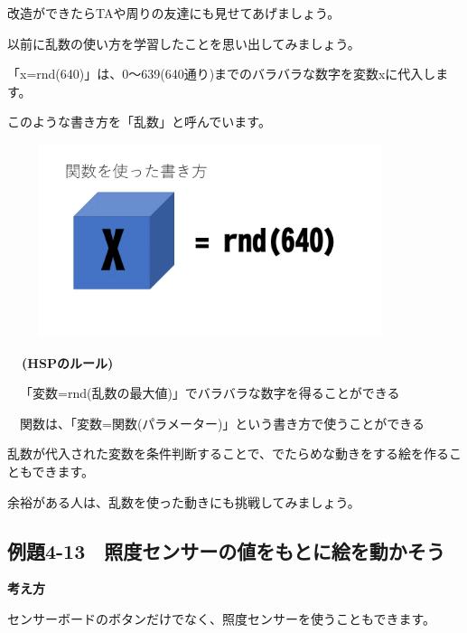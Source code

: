 \documentclass[a4paper,12pt]{jarticle}
\begin{document}
\bigskip
\bigskip
\bigskip

改造ができたらTAや周りの友達にも見せてあげましょう。

\bigskip

以前に乱数の使い方を学習したことを思い出してみましょう。

「x=rnd(640)」は、0〜639(640通り)までのバラバラな数字を変数xに代入します。

このような書き方を「乱数」と呼んでいます。


\bigskip
\bigskip

\begin{minipage}{9.781cm}
\centering
{\upshape
\includegraphics[keepaspectratio,width=11.906cm,height=5.662cm]{text04-img/text04-img039.png}}
\end{minipage}

\bigskip
\bigskip
\bigskip

{\bfseries
\ \ (HSPのルール)

\bigskip

\ \ 「変数=rnd(乱数の最大値)」でバラバラな数字を得ることができる

\ \ 関数は、「変数=関数(パラメーター)」という書き方で使うことができる}

\bigskip

乱数が代入された変数を条件判断することで、でたらめな動きをする絵を作ることもできます。

余裕がある人は、乱数を使った動きにも挑戦してみましょう。


\clearpage
\subsection{例題4-13　照度センサーの値をもとに絵を動かそう}
\bigskip
\bigskip

{\bfseries
考え方}

\bigskip

センサーボードのボタンだけでなく、照度センサーを使うこともできます。
\end{document}
